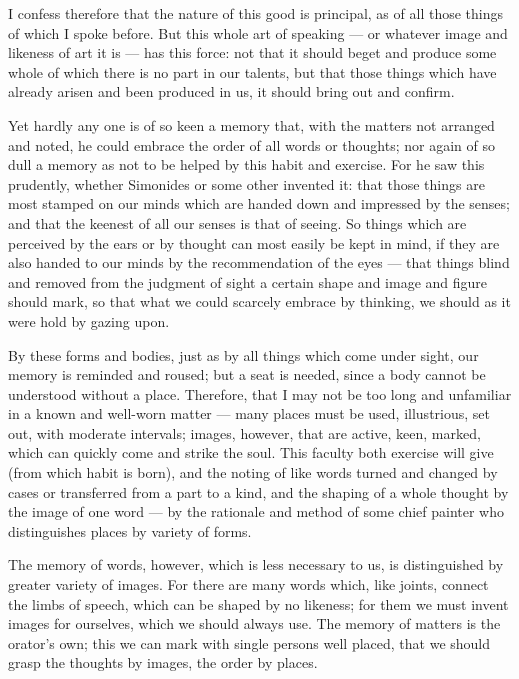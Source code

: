  I confess therefore that the nature of this good is principal, as of all those things of which I spoke before. But this whole art of speaking — or whatever image and likeness of art it is — has this force: not that it should beget and produce some whole of which there is no part in our talents, but that those things which have already arisen and been produced in us, it should bring out and confirm.

 Yet hardly any one is of so keen a memory that, with the matters not arranged and noted, he could embrace the order of all words or thoughts; nor again of so dull a memory as not to be helped by this habit and exercise. For he saw this prudently, whether Simonides or some other invented it: that those things are most stamped on our minds which are handed down and impressed by the senses; and that the keenest of all our senses is that of seeing. So things which are perceived by the ears or by thought can most easily be kept in mind, if they are also handed to our minds by the recommendation of the eyes — that things blind and removed from the judgment of sight a certain shape and image and figure should mark, so that what we could scarcely embrace by thinking, we should as it were hold by gazing upon.

 By these forms and bodies, just as by all things which come under sight, our memory is reminded and roused; but a seat is needed, since a body cannot be understood without a place. Therefore, that I may not be too long and unfamiliar in a known and well-worn matter — many places must be used, illustrious, set out, with moderate intervals; images, however, that are active, keen, marked, which can quickly come and strike the soul. This faculty both exercise will give (from which habit is born), and the noting of like words turned and changed by cases or transferred from a part to a kind, and the shaping of a whole thought by the image of one word — by the rationale and method of some chief painter who distinguishes places by variety of forms.

 The memory of words, however, which is less necessary to us, is distinguished by greater variety of images. For there are many words which, like joints, connect the limbs of speech, which can be shaped by no likeness; for them we must invent images for ourselves, which we should always use. The memory of matters is the orator's own; this we can mark with single persons well placed, that we should grasp the thoughts by images, the order by places.

